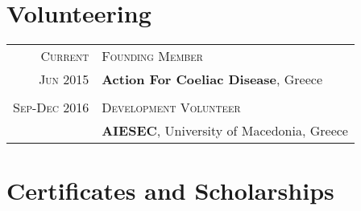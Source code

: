 \documentclass[a4paper,10pt]{article}
\begin{document}
\section{Volunteering}
\begin{tabular}{rl}
    \textsc{Current} & \textsc{Founding Member} \\ \textsc{Jun 2015} & \textbf{Action For Coeliac Disease}, Greece \\ \\ 
    \textsc{Sep-Dec 2016} & \textsc{Development Volunteer} \\& \textbf{AIESEC}, University of Macedonia, Greece\\
\end{tabular}


\section{Certificates and Scholarships}
\end{document}
